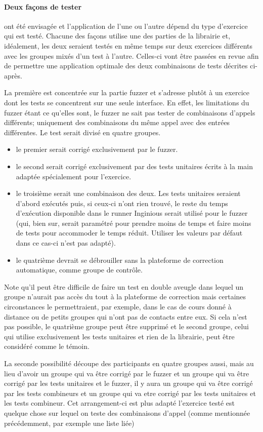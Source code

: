 \documentclass[a4paper]{report}
\begin{document}
\paragraph{Deux façons de tester} ont été envisagée et l'application de l'une ou l'autre dépend du type d'exercice qui est testé.
Chacune des façons utilise une des parties de la librairie et, idéalement, les deux seraient testés en même temps sur deux exercices différents avec les groupes mixés d'un test à l'autre.
Celles-ci vont être passées en revue afin de permettre une application optimale des deux combinaisons de tests décrites ci-après.

La première est concentrée sur la partie fuzzer et s'adresse plutôt à un exercice dont les tests se concentrent sur une seule interface.
En effet, les limitations du fuzzer étant ce qu'elles sont, le fuzzer ne sait pas tester de combinaisons d'appels différents; uniquement des combinaisons du même appel avec des entrées différentes.
Le test serait divisé en quatre groupes.
\begin{itemize}
\item le premier serait corrigé exclusivement par le fuzzer.
\item le second serait corrigé exclusivement par des tests unitaires écrits à la main adaptée spécialement pour l'exercice.
\item le troisième serait une combinaison des deux. Les tests unitaires seraient d'abord exécutés puis, si ceux-ci n'ont rien trouvé, le reste du temps d'exécution disponible dans le runner Inginious serait utilisé pour le fuzzer (qui, bien sur, serait paramétré pour prendre moins de temps et faire moins de tests pour accommoder le temps réduit. Utiliser les valeurs par défaut dans ce cas-ci n'est pas adapté).
\item le quatrième  devrait se débrouiller sans la plateforme de correction automatique, comme groupe de contrôle.
\end{itemize}
Note qu'il peut être difficile de faire un test en double aveugle dans lequel un groupe n'aurait pas accès du tout à la plateforme de correction mais certaines circonstances le permettraient, par exemple, dans le cas de cours donné à distance ou de petits groupes qui n'ont pas de contacts entre eux.
Si cela n'est pas possible, le quatrième groupe peut être supprimé et le second groupe, celui qui utilise exclusivement les tests unitaires et rien de la librairie, peut être considéré comme le témoin.

La seconde possibilité découpe des participants en quatre groupes aussi, mais au lieu d'avoir un groupe qui va être corrigé par le fuzzer et un groupe qui va être corrigé par les tests unitaires et le fuzzer,  il y aura un groupe qui va être corrigé par les tests combineurs et un groupe  qui va etre corrigé par les tests unitaires et les tests combineur.
Cet arrangement-ci est plus adapté l'exercice testé est quelque chose sur lequel on teste des combinaisons d'appel (comme mentionnée précédemment, par exemple une liste liée)
\end{document}
